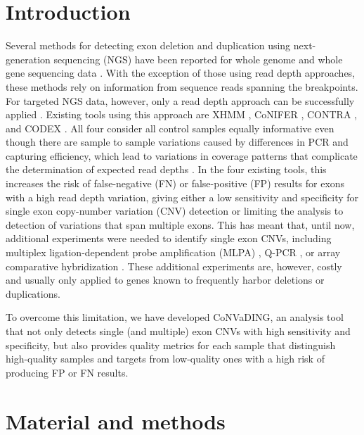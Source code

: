 \section{Introduction}\label{introduction}
Several methods for detecting exon deletion and duplication using next-generation sequencing (NGS) have been reported for whole genome \cite{Zhao_2013,Gilissen_2014,Francioli_2014} and whole gene sequencing data \cite{Wang_2014a}. 
With the exception of those using read depth approaches, these methods rely on information from sequence reads spanning the breakpoints. 
For targeted NGS data, however, only a read depth approach can be successfully applied \cite{Tan_2014}. 
Existing tools using this approach are XHMM \cite{Fromer_2012}, CoNIFER \cite{Krumm_2012}, CONTRA \cite{Li_2012}, and CODEX \cite{Jiang_2015}. 
All four consider all control samples equally informative even though there are sample to sample variations caused by differences in PCR and capturing efficiency, which lead to variations in coverage patterns that complicate the determination of expected read depths \cite{Aird_2011}\cite{Zhao_2013}. 
In the four existing tools, this increases the risk of false-negative (FN) or false-positive (FP) results for exons with a high read depth variation, giving either a low sensitivity and specificity for single exon copy-number variation (CNV) detection or limiting the analysis to detection of variations that span multiple exons. 
This has meant that, until now, additional experiments were needed to identify single exon CNVs, including multiplex ligation-dependent probe amplification (MLPA) \cite{Schouten_2002}, Q-PCR \cite{Ebenazer_2013}, or array comparative hybridization \cite{Vasson_2013}. 
These additional experiments are, however, costly and usually only applied to genes known to frequently harbor deletions or duplications. 

To overcome this limitation, we have developed CoNVaDING, an analysis tool that not only detects single (and multiple) exon CNVs with high sensitivity and specificity, but also provides quality metrics for each sample that distinguish high-quality samples and targets from low-quality ones with a high risk of producing FP or FN results.

\section{Material and methods}


